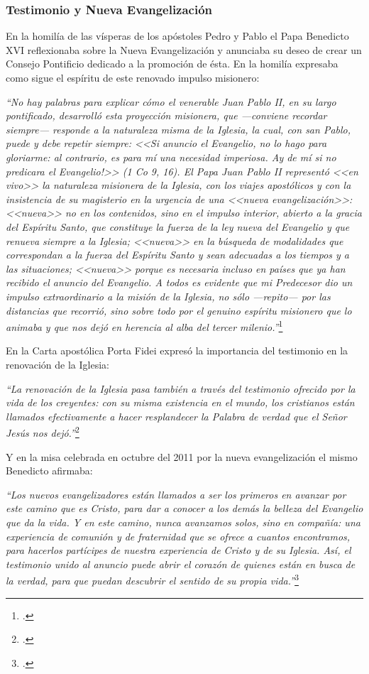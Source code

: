 \documentclass[../main.tex]{subfiles}
\begin{document}
\subsubsection{Testimonio y Nueva Evangelización}
En la homilía de las vísperas de los apóstoles Pedro y Pablo el Papa Benedicto XVI reflexionaba sobre la Nueva Evangelización y anunciaba su deseo de crear un Consejo Pontificio dedicado a la promoción de ésta. En la homilía expresaba como sigue el espíritu de este renovado impulso misionero:

\emph{
``No hay palabras para explicar cómo el venerable Juan Pablo II, en su largo pontificado, desarrolló esta proyección misionera, que —conviene recordar siempre— responde a la naturaleza misma de la Iglesia, la cual, con san Pablo, puede y debe repetir siempre: <<Si anuncio el Evangelio, no lo hago para gloriarme: al contrario, es para mí una necesidad imperiosa. \textexclamdown{}Ay de mí si no predicara el Evangelio!>> (1 Co 9, 16). El Papa Juan Pablo II representó <<en vivo>> la naturaleza misionera de la Iglesia, con los viajes apostólicos y con la insistencia de su magisterio en la urgencia de una <<nueva evangelización>>: <<nueva>> no en los contenidos, sino en el impulso interior, abierto a la gracia del Espíritu Santo, que constituye la fuerza de la ley nueva del Evangelio y que renueva siempre a la Iglesia; <<nueva>> en la búsqueda de modalidades que correspondan a la fuerza del Espíritu Santo y sean adecuadas a los tiempos y a las situaciones; <<nueva>> porque es necesaria incluso en países que ya han recibido el anuncio del Evangelio. A todos es evidente que mi Predecesor dio un impulso extraordinario a la misión de la Iglesia, no sólo —repito— por las distancias que recorrió, sino sobre todo por el genuino espíritu misionero que lo animaba y que nos dejó en herencia al alba del tercer milenio.''}\footcite{benxvi_ne}

En la Carta apostólica Porta Fidei expresó la importancia del testimonio en la renovación de la Iglesia:

\emph{``La renovación de la Iglesia pasa también a través del testimonio ofrecido por la vida de los creyentes: con su misma existencia en el mundo, los cristianos están llamados efectivamente a hacer resplandecer la Palabra de verdad que el Señor Jesús nos dejó.''}\footcite[n. 6]{PF}

Y en la misa celebrada en octubre del 2011 por la nueva evangelización el mismo Benedicto afirmaba:

\emph{``Los nuevos evangelizadores están llamados a ser los primeros en avanzar por este camino que es Cristo, para dar a conocer a los demás la belleza del Evangelio que da la vida. Y en este camino, nunca avanzamos solos, sino en compañía: una experiencia de comunión y de fraternidad que se ofrece a cuantos encontramos, para hacerlos partícipes de nuestra experiencia de Cristo y de su Iglesia. Así, el testimonio unido al anuncio puede abrir el corazón de quienes están en busca de la verdad, para que puedan descubrir el sentido de su propia vida.''}\footcite{benxvi_ne2}
\end{document}
